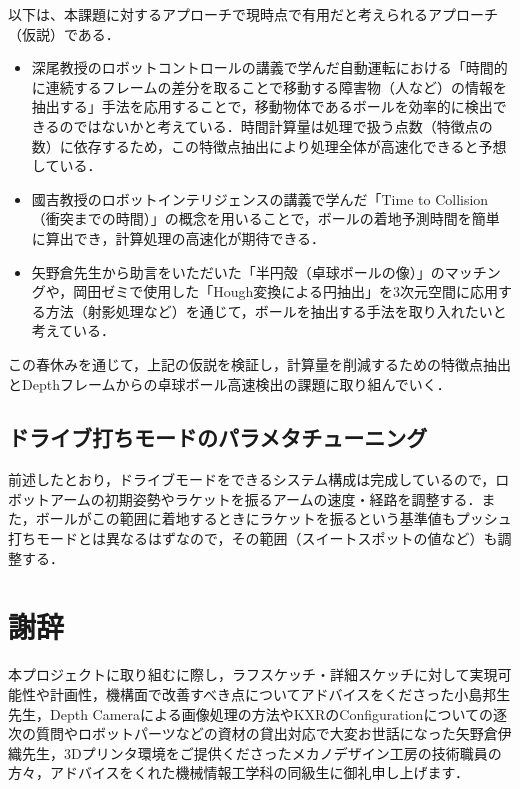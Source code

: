 \documentclass[10pt, oneside, titlepage]{ltjarticle}  %
\begin{document}
  以下は、本課題に対するアプローチで現時点で有用だと考えられるアプローチ（仮説）である．

  \begin{itemize}
    \item 深尾教授のロボットコントロールの講義で学んだ自動運転における「時間的に連続するフレームの差分を取ることで移動する障害物（人など）の情報を抽出する」手法を応用することで，移動物体であるボールを効率的に検出できるのではないかと考えている．時間計算量は処理で扱う点数（特徴点の数）に依存するため，この特徴点抽出により処理全体が高速化できると予想している．

    \item 國吉教授のロボットインテリジェンスの講義で学んだ「Time to Collision（衝突までの時間）」の概念を用いることで，ボールの着地予測時間を簡単に算出でき，計算処理の高速化が期待できる．

    \item 矢野倉先生から助言をいただいた「半円殻（卓球ボールの像）」のマッチングや，岡田ゼミで使用した「Hough変換による円抽出」を3次元空間に応用する方法（射影処理など）を通じて，ボールを抽出する手法を取り入れたいと考えている．
  \end{itemize}

  この春休みを通じて，上記の仮説を検証し，計算量を削減するための特徴点抽出とDepthフレームからの卓球ボール高速検出の課題に取り組んでいく．

  \subsection{ドライブ打ちモードのパラメタチューニング}
  前述したとおり，ドライブモードをできるシステム構成は完成しているので，ロボットアームの初期姿勢やラケットを振るアームの速度・経路を調整する．また，ボールがこの範囲に着地するときにラケットを振るという基準値もプッシュ打ちモードとは異なるはずなので，その範囲（スイートスポットの値など）も調整する．

\section{謝辞}
本プロジェクトに取り組むに際し，ラフスケッチ・詳細スケッチに対して実現可能性や計画性，機構面で改善すべき点についてアドバイスをくださった小島邦生先生，Depth Cameraによる画像処理の方法やKXRのConfigurationについての逐次の質問やロボットパーツなどの資材の貸出対応で大変お世話になった矢野倉伊織先生，3Dプリンタ環境をご提供くださったメカノデザイン工房の技術職員の方々，アドバイスをくれた機械情報工学科の同級生に御礼申し上げます．
\end{document}
